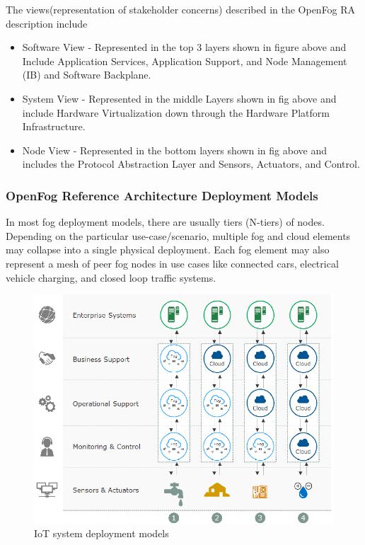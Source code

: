 \documentclass{article}
\begin{document}
The views(representation of stakeholder concerns)\cite{openfogconsortium2017} described in the OpenFog RA description include 
\begin{itemize}
\item Software View - Represented in the top 3 layers shown in figure above and Include Application Services, Application Support, and Node Management (IB) and Software Backplane\cite{openfogconsortium2017}.

\item System View - Represented in the middle Layers shown in fig above and include Hardware Virtualization down through the Hardware Platform Infrastructure\cite{openfogconsortium2017}.

\item Node View - Represented in the bottom layers shown in fig above and includes the Protocol Abstraction Layer and Sensors, Actuators, and Control\cite{openfogconsortium2017}.
\end{itemize} 

\subsubsection{OpenFog Reference Architecture Deployment Models} 

In most fog deployment models, there are usually tiers (N-tiers) of nodes. 
Depending on the particular use-case/scenario, multiple fog and cloud elements may collapse into a single physical deployment. 
Each fog element may also represent a mesh of peer fog nodes in use cases like connected cars, electrical vehicle charging, and closed loop traffic systems\cite{openfogconsortium2017}.

\begin{figure}[H]
	\centering
	\includegraphics[scale=0.5]{models.png}
	\caption{IoT system deployment models \cite{openfogconsortium2017}}
	\label{fig:depl_models}
\end{figure}
\end{document}
